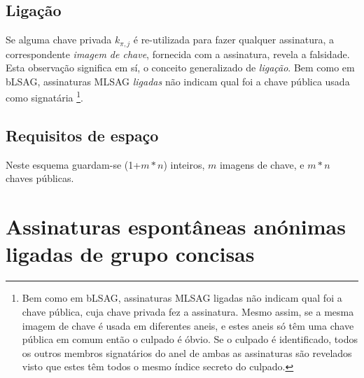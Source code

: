 \begin{description}
\subsection*{Ligação}

Se alguma chave privada \(k_{\pi, j}\) é re-utilizada para fazer qualquer assinatura, a correspondente {\em imagem de chave}, fornecida com a assinatura, revela a falsidade. Esta observação significa em sí, o conceito generalizado de {\em ligação}. 
Bem como em bLSAG, assinaturas MLSAG {\em ligadas} não indicam qual foi a chave pública usada como signatária \footnote{Bem como em bLSAG, assinaturas MLSAG ligadas não indicam qual foi a chave pública, cuja chave privada fez a assinatura. Mesmo assim, se a mesma imagem de chave é usada em diferentes aneis, e estes aneis só têm uma chave pública em comum então o culpado é óbvio. Se o culpado é identificado, todos os outros membros signatários do anel de ambas as assinaturas são revelados visto que estes têm todos o mesmo índice secreto do culpado.}.


\subsection*{Requisitos de espaço}

Neste esquema guardam-se (1+$m*n$) inteiros, $m$ imagens de chave, e $m*n$ chaves públicas.

\section{Assinaturas espontâneas anónimas ligadas de grupo concisas}
\label{sec:CLSAG}


\end{description}
